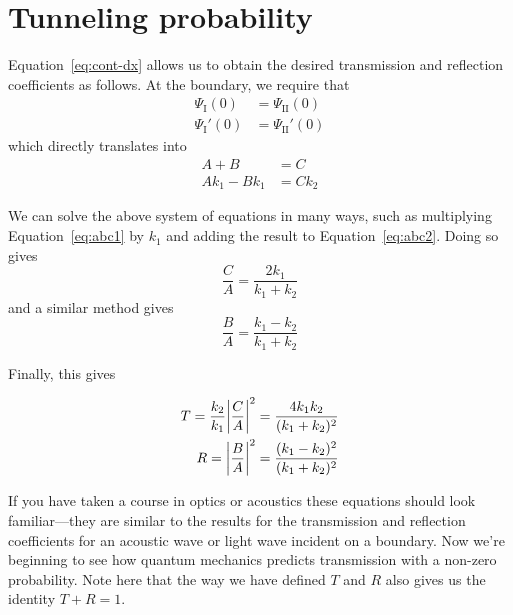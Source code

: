 \section{Tunneling probability}
Equation~\ref{eq:cont-dx} allows us to obtain the desired transmission and reflection coefficients as follows. At the boundary, we require that 
\begin{align*}
	\Psi_{\text{I}}(0) &= \Psi_{\text{II}}(0) \\
	\Psi_{\text{I}}'(0) &= \Psi_{\text{II}}'(0)
\end{align*}
which directly translates into
\begin{align}
A + B &= C \label{eq:abc1} \\
Ak_1 - Bk_1 &= Ck_2 \label{eq:abc2}
\end{align}

We can solve the above system of equations in many ways, such as multiplying Equation~\ref{eq:abc1} by $k_1$ and adding the result to Equation~\ref{eq:abc2}. Doing so gives
\begin{equation}
	\frac{C}{A} = \frac{2k_1}{k_1+k_2} \label{eq:c-a}
\end{equation}
and a similar method gives 
\begin{equation}
	\frac{B}{A} = \frac{k_1 - k_2}{k_1 + k_2} \label{eq:b-a}
\end{equation}

Finally, this gives 
\begin{tcolorbox}[title = $T$ and $R$ for finite potential step] \vspace{-2ex}
	\begin{align}
		T = \frac{k_2}{k_1}\abs{\frac{C}{A}}^2 &= \frac{4k_1k_2}{(k_1+k_2)^2} \label{eq:t-step} \\ 
		R = \abs{\frac{B}{A}}^2 &= \frac{(k_1-k_2)^2}{(k_1+k_2)^2} \label{eq:r-step}
	\end{align}
\end{tcolorbox}
If you have taken a course in optics or acoustics these equations should look familiar---they are similar to the results for the transmission and reflection coefficients for an acoustic wave or light wave incident on a boundary. Now we're beginning to see how quantum mechanics predicts transmission with a non-zero probability. Note here that the way we have defined $T$ and $R$ also gives us the identity $T + R = 1$. \par 


